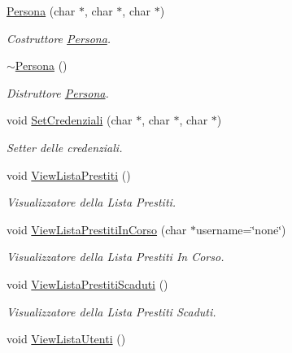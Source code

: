 \begin{DoxyCompactItemize}
\item 
\mbox{\hyperlink{class_persona_ac147ebfcfa0c66116e8ace9b53f91901}{Persona}} (char $\ast$, char $\ast$, char $\ast$)
\begin{DoxyCompactList}\small\item\em Costruttore \mbox{\hyperlink{class_persona}{Persona}}. \end{DoxyCompactList}\item 
\mbox{\label{class_persona_aa7bba61c41b05166827eb1fbfc5ee0a9}} 
\mbox{\hyperlink{class_persona_aa7bba61c41b05166827eb1fbfc5ee0a9}{$\sim$\+Persona}} ()
\begin{DoxyCompactList}\small\item\em Distruttore \mbox{\hyperlink{class_persona}{Persona}}. \end{DoxyCompactList}\item 
void \mbox{\hyperlink{class_persona_a619e90d3b2036e78778b590ea1d51bcc}{Set\+Credenziali}} (char $\ast$, char $\ast$, char $\ast$)
\begin{DoxyCompactList}\small\item\em Setter delle credenziali. \end{DoxyCompactList}\item 
void \mbox{\hyperlink{class_persona_aa3d04ab73400a071421c979e692f93b3}{View\+Lista\+Prestiti}} ()
\begin{DoxyCompactList}\small\item\em Visualizzatore della Lista Prestiti. \end{DoxyCompactList}\item 
void \mbox{\hyperlink{class_persona_a8d7f6fa850c62e1eaac15c64013367a9}{View\+Lista\+Prestiti\+In\+Corso}} (char $\ast$username=\char`\"{}none\char`\"{})
\begin{DoxyCompactList}\small\item\em Visualizzatore della Lista Prestiti In Corso. \end{DoxyCompactList}\item 
void \mbox{\hyperlink{class_persona_ade5bba69999d1ccedd4104f1c6c323b6}{View\+Lista\+Prestiti\+Scaduti}} ()
\begin{DoxyCompactList}\small\item\em Visualizzatore della Lista Prestiti Scaduti. \end{DoxyCompactList}\item 
void \mbox{\hyperlink{class_persona_ad84db334efe5f35da14f085eec7383ce}{View\+Lista\+Utenti}} ()

\end{DoxyCompactItemize}
